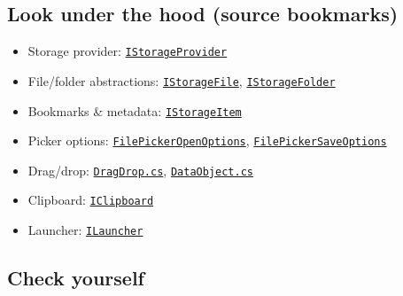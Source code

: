 \subsection{Look under the hood (source
bookmarks)}\label{look-under-the-hood-source-bookmarks-14}

\begin{itemize}
\tightlist
\item
  Storage provider:
  \href{https://github.com/AvaloniaUI/Avalonia/blob/master/src/Avalonia.Base/Platform/Storage/IStorageProvider.cs}{\passthrough{\lstinline!IStorageProvider!}}
\item
  File/folder abstractions:
  \href{https://github.com/AvaloniaUI/Avalonia/blob/master/src/Avalonia.Base/Platform/Storage/FileIO/IStorageFile.cs}{\passthrough{\lstinline!IStorageFile!}},
  \href{https://github.com/AvaloniaUI/Avalonia/blob/master/src/Avalonia.Base/Platform/Storage/FileIO/IStorageFolder.cs}{\passthrough{\lstinline!IStorageFolder!}}
\item
  Bookmarks \& metadata:
  \href{https://github.com/AvaloniaUI/Avalonia/blob/master/src/Avalonia.Base/Platform/Storage/IStorageItem.cs}{\passthrough{\lstinline!IStorageItem!}}
\item
  Picker options:
  \href{https://github.com/AvaloniaUI/Avalonia/blob/master/src/Avalonia.Base/Platform/Storage/FilePickerOpenOptions.cs}{\passthrough{\lstinline!FilePickerOpenOptions!}},
  \href{https://github.com/AvaloniaUI/Avalonia/blob/master/src/Avalonia.Base/Platform/Storage/FilePickerSaveOptions.cs}{\passthrough{\lstinline!FilePickerSaveOptions!}}
\item
  Drag/drop:
  \href{https://github.com/AvaloniaUI/Avalonia/blob/master/src/Avalonia.Base/Input/DragDrop.cs}{\passthrough{\lstinline!DragDrop.cs!}},
  \href{https://github.com/AvaloniaUI/Avalonia/blob/master/src/Avalonia.Base/Input/DataObject.cs}{\passthrough{\lstinline!DataObject.cs!}}
\item
  Clipboard:
  \href{https://github.com/AvaloniaUI/Avalonia/blob/master/src/Avalonia.Base/Platform/IClipboard.cs}{\passthrough{\lstinline!IClipboard!}}
\item
  Launcher:
  \href{https://github.com/AvaloniaUI/Avalonia/blob/master/src/Avalonia.Base/Platform/Storage/ILauncher.cs}{\passthrough{\lstinline!ILauncher!}}
\end{itemize}

\subsection{Check yourself}\label{check-yourself-14}


